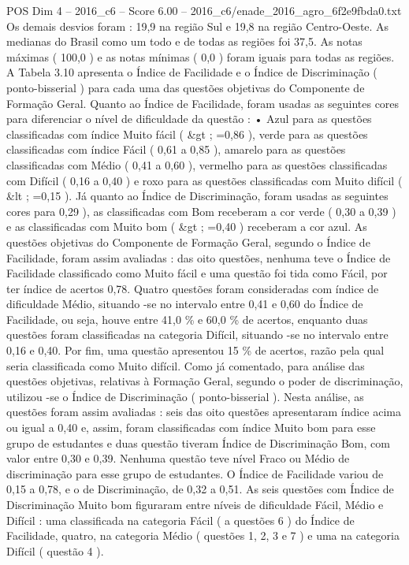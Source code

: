\begin{textsample}{POS Dim 4 – 2016\_c6 – Score 6.00 – 2016\_c6/enade\_2016\_agro\_6f2e9fbda0.txt}
Os demais desvios foram : 19,9 na região Sul e 19,8 na região Centro-Oeste.
As medianas do Brasil como um todo e de todas as regiões foi 37,5.
As notas máximas ( 100,0 ) e as notas mínimas ( 0,0 ) foram iguais para todas as regiões.
A Tabela 3.10 apresenta o Índice de Facilidade e o Índice de Discriminação ( ponto-bisserial ) para cada uma das questões objetivas do Componente de Formação Geral.
Quanto ao Índice de Facilidade, foram usadas as seguintes cores para diferenciar o nível de dificuldade da questão : • Azul para as questões classificadas com índice Muito fácil ( \&gt ; =0,86 ), verde para as questões classificadas com índice Fácil ( 0,61 a 0,85 ), amarelo para as questões classificadas com Médio ( 0,41 a 0,60 ), vermelho para as questões classificadas com Difícil ( 0,16 a 0,40 ) e roxo para as questões classificadas com Muito difícil ( \&lt ; =0,15 ).
Já quanto ao Índice de Discriminação, foram usadas as seguintes cores para 0,29 ), as classificadas com Bom receberam a cor verde ( 0,30 a 0,39 ) e as classificadas com Muito bom ( \&gt ; =0,40 ) receberam a cor azul.
As questões objetivas do Componente de Formação Geral, segundo o Índice de Facilidade, foram assim avaliadas : das oito questões, nenhuma teve o Índice de Facilidade classificado como Muito fácil e uma questão foi tida como Fácil, por ter índice de acertos 0,78.
Quatro questões foram consideradas com índice de dificuldade Médio, situando -se no intervalo entre 0,41 e 0,60 do Índice de Facilidade, ou seja, houve entre 41,0 \% e 60,0 \% de acertos, enquanto duas questões foram classificadas na categoria Difícil, situando -se no intervalo entre 0,16 e 0,40.
Por fim, uma questão apresentou 15 \% de acertos, razão pela qual seria classificada como Muito difícil.
Como já comentado, para análise das questões objetivas, relativas à Formação Geral, segundo o poder de discriminação, utilizou -se o Índice de Discriminação ( ponto-bisserial ).
Nesta análise, as questões foram assim avaliadas : seis das oito questões apresentaram índice acima ou igual a 0,40 e, assim, foram classificadas com índice Muito bom para esse grupo de estudantes e duas questão tiveram Índice de Discriminação Bom, com valor entre 0,30 e 0,39.
Nenhuma questão teve nível Fraco ou Médio de discriminação para esse grupo de estudantes.
O Índice de Facilidade variou de 0,15 a 0,78, e o de Discriminação, de 0,32 a 0,51.
As seis questões com Índice de Discriminação Muito bom figuraram entre níveis de dificuldade Fácil, Médio e Difícil : uma classificada na categoria Fácil ( a questões 6 ) do Índice de Facilidade, quatro, na categoria Médio ( questões 1, 2, 3 e 7 ) e uma na categoria Difícil ( questão 4 ).

\end{textsample}
